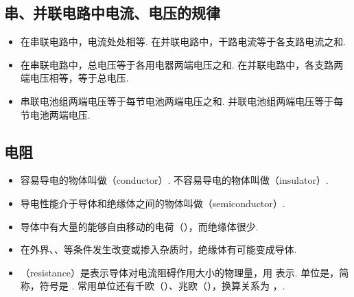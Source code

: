 \subsection{串、并联电路中电流、电压的规律}
\vspace{10pt}
\begin{itemize}
\item 在串联电路中，电流处处相等. 在并联电路中，干路电流等于各支路电流之和.
\item 在串联电路中，总电压等于各用电器两端电压之和. 在并联电路中，各支路两端电压相等，等于总电压.
\item 串联电池组两端电压等于每节电池两端电压之和. 并联电池组两端电压等于每节电池两端电压.
\end{itemize}

\subsection{电阻}
\vspace{10pt}
\begin{itemize}
\item 容易导电的物体叫做（conductor）. 不容易导电的物体叫做（insulator）.
\item 导电性能介于导体和绝缘体之间的物体叫做（semiconductor）.
\item 导体中有大量的能够自由移动的电荷（），而绝缘体很少.
\item 在外界、、等条件发生改变或掺入杂质时，绝缘体有可能变成导体.
\item {}（resistance）是表示导体对电流阻碍作用大小的物理量，用  表示. 单位是，简称，符号是 \blue{$\bm\Omega$}. 常用单位还有千欧（）、兆欧（），换算关系为 ，.
\end{itemize}